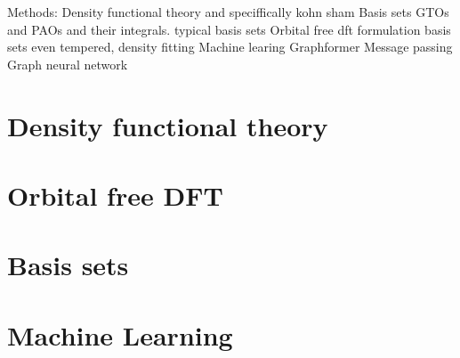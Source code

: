 Methods:
Density functional theory and speciffically kohn sham
Basis sets GTOs and PAOs and their integrals. typical basis sets
Orbital free dft formulation basis sets even tempered, density fitting 
Machine learing
Graphformer  Message passing Graph neural network


\section{Density functional theory}

\section{Orbital free DFT}

\section{Basis sets}

\section{Machine Learning}